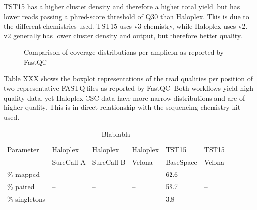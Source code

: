 TST15 has a higher cluster density and therefore a higher total yield, but has
lower reads passing a phred-score threshold of Q30 than Haloplex. This is due to
the different chemistries used. TST15 uses v3 chemistry, while Haloplex uses v2.
v2 generally has lower cluster density and output, but therefore better quality.

\begin{figure}[!tbp]
  \centering
  \hfill
  \caption{Comparison of coverage distributions per amplicon as reported by FastQC}
\end{figure}

Table XXX shows the boxplot representations of the read qualities per position
of two representative FASTQ files as reported by FastQC. Both workflows yield high
quality data, yet Haloplex CSC data have more narrow distributions and are of higher
quality. This is in direct relationship with the sequencing chemistry kit used.

\begin{table}[!htbp]
  \caption[samtools_flagstat]{Blablabla}
  \centering
  \begin{tabular}{|p{2cm}|p{2cm}|p{2cm}|p{2cm}|p{2cm}|p{2cm}|}
  \hline
  Parameter & Haloplex & Haloplex & Haloplex & TST15 & TST15 \\
  & SureCall A & SureCall B & Velona & BaseSpace & Velona \\ \hline \hline
  \% mapped & -- & -- & -- & 62.6 & -- \\
  \% paired & -- & -- & -- & 58.7 & -- \\
  \% singletons & -- & -- & -- & 3.8 & -- \\ \hline
  \end{tabular}
\end{table}

